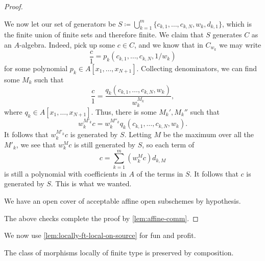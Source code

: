 \documentclass[../notes.tex]{subfiles}
\begin{document}
\begin{proof}
\begin{listroman}
		We now let our set of generators be $S\coloneqq\bigcup_{k=1}^m\{c_{k,1},\ldots,c_{k,N},w_k,d_{k,1}\}$, which is the finite union of finite sets and therefore finite. We claim that $S$ generates $C$ as an $A$-algebra. Indeed, pick up some $c\in C$, and we know that in $C_{w_k}$ we may write
		\[\frac c1=p_k\left(c_{k,1},\ldots,c_{k,N},1/w_k\right)\]
		for some polynomial $p_k\in A[x_1,\ldots,x_{N+1}]$. Collecting denominators, we can find some $M_k$ such that
		\[\frac c1=\frac{q_k(c_{k,1},\ldots,c_{k,N},w_k)}{w_k^{M_k}},\]
		where $q_k\in A[x_1,\ldots,x_{N+1}]$. Thus, there is some $M_k',M_k''$ such that
		\[w_k^{M'_k}c=w_k^{M''_k}q_k(c_{k,1},\ldots,c_{k,N},w_k).\]
		It follows that $w_k^{M'_k}c$ is generated by $S$. Letting $M$ be the maximum over all the $M'_k$, we see that $w_k^Mc$ is still generated by $S$, so each term of
		\[c=\sum_{k=1}^m\left(w_k^Mc\right)d_{k,M}\]
		is still a polynomial with coefficients in $A$ of the terms in $S$. It follows that $c$ is generated by $S$. This is what we wanted.

		\item We have an open cover of acceptable affine open subschemes by hypothesis.
	\end{listroman}
	The above checks complete the proof by \autoref{lem:affine-comm}.
\end{proof}
We now use \autoref{lem:locally-ft-local-on-source} for fun and profit.
\begin{lemma}
	The class of morphisms locally of finite type is preserved by composition.
\end{lemma}
\end{document}
